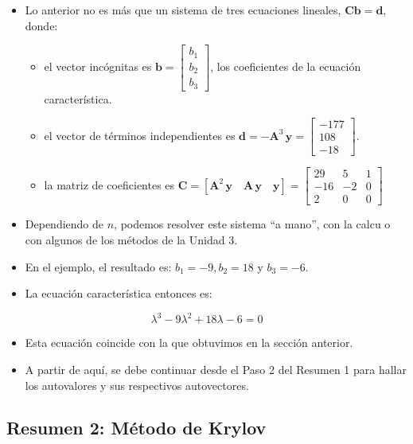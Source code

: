 \documentclass[openany]{book}
\providecommand{\tightlist}{%
  \setlength{\itemsep}{0pt}\setlength{\parskip}{0pt}}
\begin{document}
\begin{itemize}
\item
  Lo anterior no es más que un sistema de tres ecuaciones lineales, \(\mathbf{Cb=d}\), donde:

  \begin{itemize}
  \tightlist
  \item
    el vector incógnitas es \(\mathbf{b} = \begin{bmatrix} b_1 \\ b_2 \\ b_3 \end{bmatrix}\), los coeficientes de la ecuación característica.
  \item
    el vector de términos independientes es \(\mathbf{d} = - \mathbf{A}^3 \, \mathbf{y} = \begin{bmatrix} -177 \\ 108 \\ -18 \end{bmatrix}\).
  \item
    la matriz de coeficientes es \(\mathbf{C} = [\mathbf{A}^{2} \, \mathbf{y} \quad \mathbf{A} \, \mathbf{y} \quad \mathbf{y}] = \begin{bmatrix} 29 & 5 & 1 \\ -16 & -2 & 0 \\2 & 0 & 0 \end{bmatrix}\)
  \end{itemize}
\item
  Dependiendo de \(n\), podemos resolver este sistema ``a mano'', con la calcu o con algunos de los métodos de la Unidad 3.
\item
  En el ejemplo, el resultado es: \(b_1 = -9, b_2 = 18\) y \(b_3 = -6\).
\item
  La ecuación característica entonces es:
\end{itemize}

\[
\lambda^3 - 9 \lambda^2 + 18 \lambda - 6 = 0
\]

\begin{itemize}
\tightlist
\item
  Esta ecuación coincide con la que obtuvimos en la sección anterior.
\item
  A partir de aquí, se debe continuar desde el Paso 2 del Resumen 1 para hallar los autovalores y sus respectivos autovectores.
\end{itemize}

\hypertarget{resumen-2-muxe9todo-de-krylov}{%
\subsection*{Resumen 2: Método de Krylov}\label{resumen-2-muxe9todo-de-krylov}}
\end{document}
